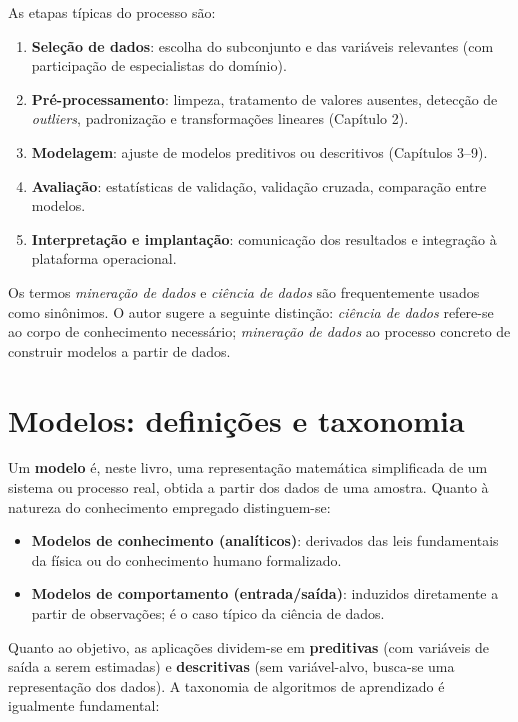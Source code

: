 As etapas típicas do processo são:
\begin{enumerate}[label=\textbf{(\arabic*)}, leftmargin=1.2cm]
  \item \textbf{Seleção de dados}: escolha do subconjunto e das variáveis
        relevantes (com participação de especialistas do domínio).
  \item \textbf{Pré-processamento}: limpeza, tratamento de valores
        ausentes, detecção de \emph{outliers}, padronização e
        transformações lineares (Capítulo 2).
  \item \textbf{Modelagem}: ajuste de modelos preditivos ou descritivos
        (Capítulos 3--9).
  \item \textbf{Avaliação}: estatísticas de validação, validação cruzada,
        comparação entre modelos.
  \item \textbf{Interpretação e implantação}: comunicação dos resultados e
        integração à plataforma operacional.
\end{enumerate}

Os termos \emph{mineração de dados} e \emph{ciência de dados} são
frequentemente usados como sinônimos. O autor sugere a seguinte
distinção: \emph{ciência de dados} refere-se ao corpo de conhecimento
necessário; \emph{mineração de dados} ao processo concreto de construir
modelos a partir de dados.

\section{Modelos: definições e taxonomia}

Um \textbf{modelo} é, neste livro, uma representação matemática
simplificada de um sistema ou processo real, obtida a partir dos dados de
uma amostra. Quanto à natureza do conhecimento empregado distinguem-se:

\begin{itemize}[leftmargin=1.2cm]
  \item \textbf{Modelos de conhecimento (analíticos)}: derivados das leis
        fundamentais da física ou do conhecimento humano formalizado.
  \item \textbf{Modelos de comportamento (entrada/saída)}: induzidos
        diretamente a partir de observações; é o caso típico da ciência
        de dados.
\end{itemize}

Quanto ao objetivo, as aplicações dividem-se em \textbf{preditivas} (com
variáveis de saída a serem estimadas) e \textbf{descritivas} (sem
variável-alvo, busca-se uma representação dos dados). A taxonomia de
algoritmos de aprendizado é igualmente fundamental:

